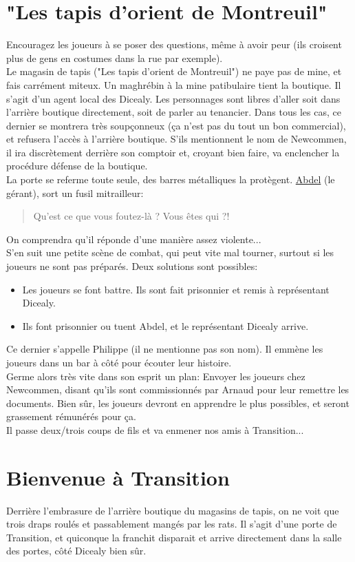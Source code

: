 \documentclass[10pt,a4paper,twocolumn]{article}
\begin{document}
\section{"Les tapis d'orient de Montreuil"}
Encouragez les joueurs à se poser des questions, même à avoir peur (ils croisent plus de gens en costumes dans la rue par exemple). \\
Le magasin de tapis ("Les tapis d'orient de Montreuil") ne paye pas de mine, et fais carrément miteux. Un maghrébin à la mine patibulaire tient la boutique. Il s'agit d'un agent local des Dicealy. Les personnages sont libres d'aller soit dans l'arrière boutique directement, soit de parler au tenancier. Dans tous les cas, ce dernier se montrera très soupçonneux (ça n'est pas du tout un bon commercial), et refusera l'accès à l'arrière boutique. S'ils mentionnent le nom de Newcommen, il ira discrètement derrière son comptoir et, croyant bien faire, va enclencher la procédure défense de la boutique.\\
La porte se referme toute seule, des barres métalliques la protègent. \hyperlink{abdel}{Abdel} (le gérant), sort un fusil mitrailleur:
\begin{quote}
Qu'est ce que vous foutez-là ? Vous êtes qui ?!
\end{quote}
On comprendra qu'il réponde d'une manière assez violente... \\
S'en suit une petite scène de combat, qui peut vite mal tourner, surtout si les joueurs ne sont pas préparés. Deux solutions sont possibles:
\begin{itemize}
	\item Les joueurs se font battre. Ils sont fait prisonnier et remis à représentant Dicealy.
	\item Ils font prisonnier ou tuent Abdel, et le représentant Dicealy arrive.
\end{itemize}
Ce dernier s'appelle Philippe (il ne mentionne pas son nom). Il emmène les joueurs dans un bar à côté pour écouter leur histoire.\\
Germe alors très vite dans son esprit un plan: Envoyer les joueurs chez Newcommen, disant qu'ils sont commissionnés par Arnaud pour leur remettre les documents. Bien sûr, les joueurs devront en apprendre le plus possibles, et seront grassement rémunérés pour ça. \\
Il passe deux/trois coups de fils et va enmener nos amis à Transition...

\section{Bienvenue à Transition}
Derrière l'embrasure de l'arrière boutique du magasins de tapis, on ne voit que trois draps roulés et passablement mangés par les rats. Il s'agit d'une porte de Transition, et quiconque la franchit disparait et arrive directement dans la salle des portes, côté Dicealy bien sûr.
\end{document}
